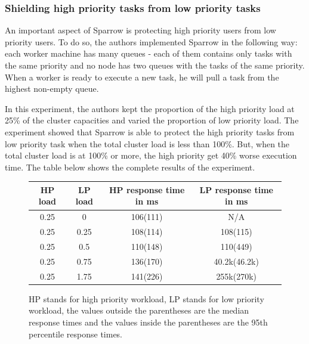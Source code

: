 \documentclass[11pt]{article}
\begin{document}
        
        \subsubsection*{Shielding high priority tasks from low priority tasks}
        	 \label{preemption}
        	
            An important aspect of Sparrow is protecting high priority users from low priority users. To do so, the authors implemented Sparrow in the following way: each worker machine has many queues - each of them contains only tasks with the same priority and no node has two queues with the tasks of the same priority. When a worker is ready to execute a new task, he will pull a task from the highest non-empty queue.
            
            In this experiment, the authors kept the proportion of the high priority load at 25\% of the cluster capacities and varied the proportion of low priority load. The experiment showed that Sparrow is able to protect the high priority tasks from low priority task when the total cluster load is less than 100\%. But, when the total cluster load is at 100\% or more, the high priority get 40\% worse execution time. The table below shows the complete results of the experiment.
            
            \begin{figure}[H]
            		\caption{HP stands for high priority workload, LP stands for low priority workload, the values outside the parentheses are the median response times and the values inside the parentheses are the 95th percentile response times.}
                \begin{tabular}{ | c | c | c | c |}
                    \hline
                    HP load & LP load & HP response time in ms & LP response time in ms  \\ \hline
                    0.25 & 0 & 106(111) & N/A  \\ \hline
                    0.25 & 0.25 & 108(114) & 108(115) \\ \hline
                    0.25 & 0.5 & 110(148) & 110(449) \\ \hline
                    0.25 & 0.75 & 136(170) & 40.2k(46.2k) \\ \hline
                    0.25 & 1.75 & 141(226) & 255k(270k) \\
                    \hline
                \end{tabular}
        	\end{figure}
        	
\end{document}
